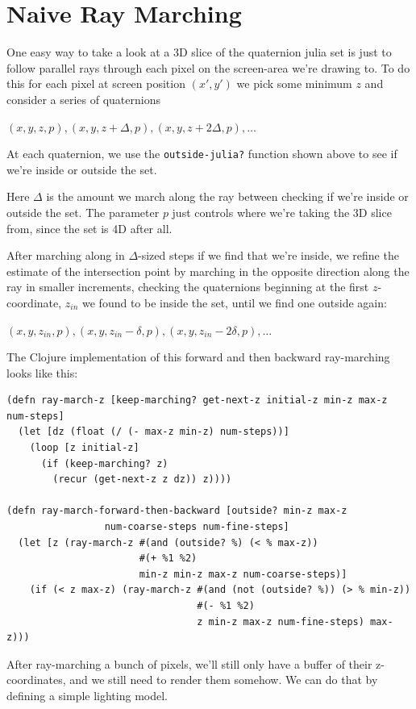 \documentclass[11pt]{article}
\begin{document}
\section{Naive Ray Marching}

One easy way to take a look at a 3D slice of the quaternion julia set is just to follow parallel rays through each pixel on the screen-area we're drawing to. To do this for each pixel at screen position $(x', y')$ we pick some minimum $z$ and consider a series of quaternions 

$(x, y, z, p), (x, y, z + \Delta, p), (x, y, z + 2 \Delta, p), \ldots$ 

At each quaternion, we use the \texttt{outside-julia?} function shown above to see if we're inside or outside the set. 

Here $\Delta$ is the amount we march along the ray between checking if we're inside or outside the set. The parameter $p$ just controls where we're taking the 3D slice from, since the set is 4D after all.

After marching along in $\Delta$-sized steps if we find that we're inside, we refine the estimate of the intersection point by marching in the opposite direction along the ray in smaller increments, checking the quaternions beginning at the first $z$-coordinate, $z_{in}$ we found to be inside the set, until we find one outside again:

$(x, y, z_{in}, p), (x, y, z_{in} - \delta, p), (x, y, z_{in} - 2 \delta, p), \ldots$ 

The Clojure implementation of this forward and then backward ray-marching looks like this:

\begin{lstlisting}
(defn ray-march-z [keep-marching? get-next-z initial-z min-z max-z num-steps]
  (let [dz (float (/ (- max-z min-z) num-steps))]
    (loop [z initial-z]  
      (if (keep-marching? z) 
        (recur (get-next-z z dz)) z)))) 

(defn ray-march-forward-then-backward [outside? min-z max-z
                 num-coarse-steps num-fine-steps] 
  (let [z (ray-march-z #(and (outside? %) (< % max-z)) 
                       #(+ %1 %2) 
                       min-z min-z max-z num-coarse-steps)]
    (if (< z max-z) (ray-march-z #(and (not (outside? %)) (> % min-z))
                                 #(- %1 %2)
                                 z min-z max-z num-fine-steps) max-z)))
\end{lstlisting}

After ray-marching a bunch of pixels, we'll still only have a buffer of their z-coordinates, and we still need to render them somehow. We can do that by defining a simple lighting model.
\end{document}
